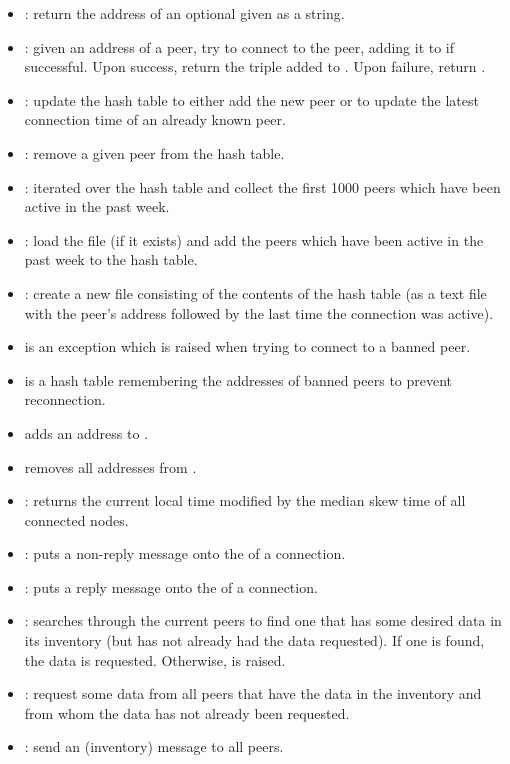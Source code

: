 \begin{itemize}
\item {}: return the address of an optional given {} as a string.
\item {}: given an address of a peer, try to connect to the peer, adding it to {} if successful.
Upon success, return the triple added to {}.
Upon failure, return {}.
\item {}: update the hash table {} to either add the new peer or to update the latest connection time of an already known peer.
\item {}: remove a given peer from the {} hash table.
\item {}: iterated over the {} hash table and collect the first 1000 peers which have been active in the past week.
\item {}: load the {} file (if it exists) and add the peers which have been active in the past week to the {} hash table.
\item {}: create a new {} file consisting of the contents of the {} hash table (as a text file with the peer's address followed by the last time the connection was active).
\item {} is an exception which is raised when trying to connect to a banned peer.
\item {} is a hash table remembering the addresses of banned peers to prevent reconnection.
\item {} adds an address to {}.
\item {} removes all addresses from {}.
\item {}: returns the current local time modified by the median skew time of all connected nodes.
\item {}: puts a non-reply message onto the {} of a connection.
\item {}: puts a reply message onto the {} of a connection.
\item {}: searches through the current peers to find
one that has some desired data in its inventory (but has not already had the data requested).
If one is found, the data is requested.
Otherwise, {} is raised.
\item {}: request some data from all peers that have
the data in the inventory and from whom the data has not already been requested.
\item {}: send an {} (inventory) message to all peers.
\end{itemize}

